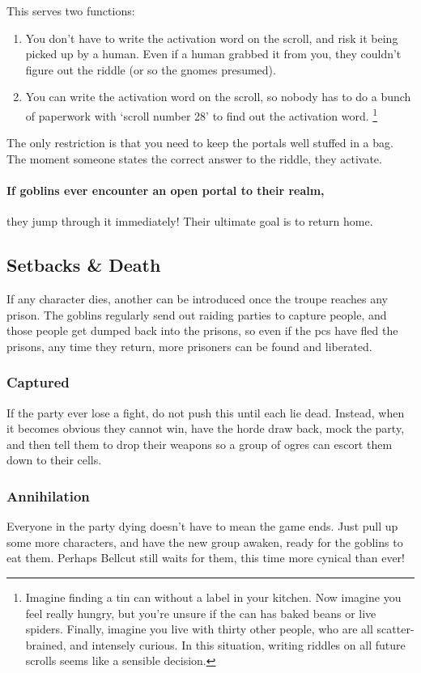 \begin{multicols}{2}
This serves two functions:

\begin{enumerate}
  \item
  You don't have to write the activation word on the scroll, and risk it being picked up by a human.
  Even if a human grabbed it from you, they couldn't figure out the riddle (or so the gnomes presumed).
  \item
  You can write the activation word on the scroll, so nobody has to do a bunch of paperwork with `scroll number 28' to find out the activation word.%
  \footnote{Imagine finding a tin can without a label in your kitchen.
  Now imagine you feel really hungry, but you're unsure if the can has baked beans or live spiders.
  Finally, imagine you live with thirty other people, who are all scatter-brained, and intensely curious.
  In this situation, writing riddles on all future scrolls seems like a sensible decision.}
\end{enumerate}

The only restriction is that you need to keep the portals well stuffed in a bag.
The moment someone states the correct answer to the riddle, they activate.

\labyrinthScroll

\paragraph{If goblins ever encounter an open portal to their realm,}
they jump through it immediately!
Their ultimate goal is to return home.

\subsection{Setbacks \& Death}

If any character dies, another can be introduced once the troupe reaches any prison.
The goblins regularly send out raiding parties to capture people, and those people get dumped back into the prisons, so even if the \glspl{pc} have fled the prisons, any time they return, more prisoners can be found and liberated.

\subsubsection{Captured}

If the party ever lose a fight, do not push this until each lie dead.
Instead, when it becomes obvious they cannot win, have the horde draw back, mock the party, and then tell them to drop their weapons so a group of ogres can escort them down to their cells.

\subsubsection{Annihilation}

Everyone in the party dying doesn't have to mean the game ends.
Just pull up some more characters, and have the new group awaken, ready for the goblins to eat them.
Perhaps Bellcut still waits for them, this time more cynical than ever!


\end{multicols}
